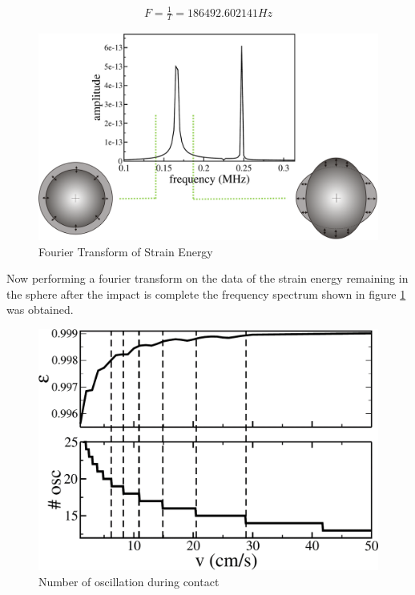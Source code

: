 \begin{align}
F = \frac{1}{T} = 186492.602141Hz
\end{align}

\begin{figure}[H]
\centering
\includegraphics[scale=0.5]{../images/fft/spectrummodes.png}
\caption{Fourier Transform of Strain Energy}
\label{fig:spectrum}
\end{figure}

Now performing a fourier transform on the data of the strain energy remaining in the sphere after the impact is complete the frequency spectrum shown in figure \ref{fig:spectrum} was obtained.

\begin{figure}[H]
\centering
\includegraphics[scale=0.5]{../images/fft/oscillations.png}
\caption{Number of oscillation during contact}
\label{fig:oscillations}
\end{figure}

